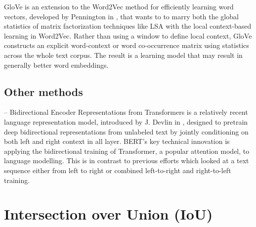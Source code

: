 GloVe is an extension to the Word2Vec method for efficiently learning
word vectors, developed by Pennington \etal{} in ,
that wants to to marry both the global statistics of matrix
factorization techniques like LSA with the local context-based
learning in Word2Vec. Rather than using a window to define local
context, GloVe constructs an explicit word-context or word
co-occurrence matrix using statistics across the whole text corpus.
The result is a learning model that may result in generally better
word embeddings.

\subsection{Other methods}

 -- Bidirectional Encoder Representations from Transformers is a relatively recent language representation model, introduced by J. Devlin \etal{} in ,  designed to pretrain deep bidirectional representations from
unlabeled text by jointly conditioning on both left and right context in all layer. BERT’s key technical innovation is applying the bidirectional training of Transformer, a popular attention model, to language modelling. This is in contrast to previous efforts which looked at a text sequence either from left to right or combined left-to-right and right-to-left training.


\section{Intersection over Union (IoU)}

